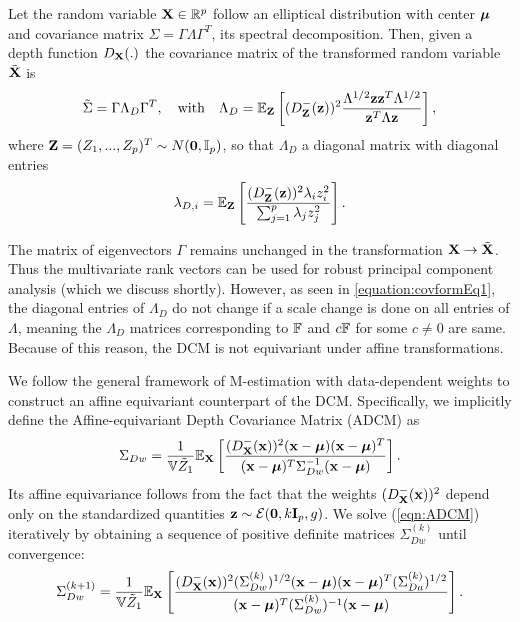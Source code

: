 \begin{Theorem} \label{Theorem:covform}
Let the random variable ${\mathbf{X}} \in \mathbb{R}^p$ follow an elliptical distribution with center ${\boldsymbol{\mu}}$ and covariance matrix $\Sigma = \Gamma\Lambda\Gamma^T$, its spectral decomposition. Then, given a depth function $D_{\mathbf{X}}(.)$ the covariance matrix of the transformed random variable $\tilde{{\mathbf{X}}}$ is
\begin{equation} \label{equation:covformEq1}
\tilde \Sigma = \Gamma \Lambda_{D} \Gamma^T,\quad\mbox{with}\quad \Lambda_{D} = \mathbb E_{\mathbf{Z}} \left[ (D^-_{\mathbf{Z}}({\bf{z}}))^2 \frac{\Lambda^{1/2} {\bf{z}} {\bf{z}}^T \Lambda^{1/2}}{{\bf{z}}^T \Lambda {\bf{z}}} \right],
\end{equation}
where ${\mathbf{Z}} = (Z_1,...,Z_p)^T \sim N({\bf 0}, {\mathbb{I}}_p)$, so that $\Lambda_{D}$ a diagonal matrix with diagonal entries
%
$$
\lambda_{D,i} = \mathbb E_{\mathbf{Z}} \left[ \frac{(D^-_{\mathbf{Z}}({\bf{z}}))^2 \lambda_i z_i^2}{\sum_{j=1}^p \lambda_j z_j^2} \right].
$$
\end{Theorem}

The matrix of eigenvectors $\Gamma$ remains unchanged in the transformation ${\mathbf{X}} \rightarrow \tilde {{\mathbf{X}}}$. Thus the multivariate rank vectors can be used for robust principal component analysis (which we discuss shortly). However, as seen in \eqref{equation:covformEq1}, the diagonal entries of $\Lambda_{D}$ do not change if a scale change is done on all entries of $\Lambda$, meaning the $\Lambda_{D}$ matrices corresponding to ${\mathbb{F}}$ and $c {\mathbb{F}}$ for some $c \neq 0$ are same. Because of this reason, the DCM is not equivariant under affine transformations.

We follow the general framework of M-estimation with data-dependent weights \citep{HuberBook81} to construct an affine equivariant counterpart of the DCM. Specifically, we implicitly define the Affine-equivariant Depth Covariance Matrix (ADCM) as
%
\begin{equation} \label{eqn:ADCM}
\Sigma_{Dw} = \frac{1}{ {\mathbb{V}} \tilde Z_1 } {\mathbb{E}}_{\mathbf{X}} \left[ \frac{(D^-_{\mathbf{X}}({\bf{x}}))^2 ({\bf{x}} - {\boldsymbol{\mu}}) ({\bf{x}} - {\boldsymbol{\mu}})^T}{({\bf{x}} - {\boldsymbol{\mu}})^T \Sigma_{Dw}^{-1} ({\bf{x}} - {\boldsymbol{\mu}})} \right].
\end{equation}
%
Its affine equivariance follows from the fact that the weights $(D^-_{\mathbf{X}} ({\bf{x}}))^2$ depend only on the standardized quantities ${\bf{z}} \sim \mathcal{E} ({\bf 0}, k {\mathbf{I}}_p, g)$. We solve (\ref{eqn:ADCM}) iteratively by obtaining a sequence of positive definite matrices $\Sigma^{(k)}_{Dw}$ until convergence:
%
$$
\Sigma^{(k+1)}_{Dw} = \frac{1}{{\mathbb{V}} \tilde Z_1 } {\mathbb{E}}_{\mathbf{X}} \left[ \frac{(D^-_{\mathbf{X}}({\bf{x}}))^2 (\Sigma^{(k)}_{Dw})^{1/2} ({\bf{x}} - {\boldsymbol{\mu}}) ({\bf{x}} - {\boldsymbol{\mu}})^T (\Sigma^{(k)}_{Da})^{1/2}}{({\bf{x}} - {\boldsymbol{\mu}})^T (\Sigma^{(k)}_{Dw})^{-1} ({\bf{x}} - {\boldsymbol{\mu}})} \right].
$$
%

